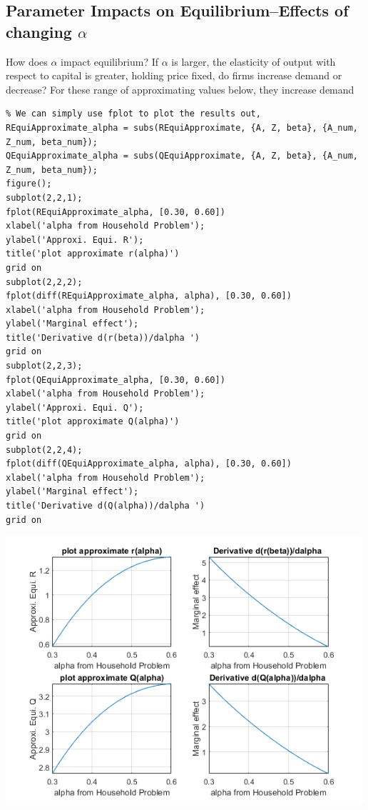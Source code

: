 \documentclass[
]{book}
\begin{document}
\hypertarget{parameter-impacts-on-equilibriumeffects-of-changing-alpha}{%
\subsection{\texorpdfstring{Parameter Impacts on Equilibrium--Effects of changing \(\alpha\)}{Parameter Impacts on Equilibrium--Effects of changing \textbackslash alpha}}\label{parameter-impacts-on-equilibriumeffects-of-changing-alpha}}

How does \(\alpha\) impact equilibrium? If \(\alpha\) is larger, the
elasticity of output with respect to capital is greater, holding price
fixed, do firms increase demand or decrease? For these range of
approximating values below, they increase demand

\begin{verbatim}
% We can simply use fplot to plot the results out, 
REquiApproximate_alpha = subs(REquiApproximate, {A, Z, beta}, {A_num, Z_num, beta_num});
QEquiApproximate_alpha = subs(QEquiApproximate, {A, Z, beta}, {A_num, Z_num, beta_num});
figure();
subplot(2,2,1);
fplot(REquiApproximate_alpha, [0.30, 0.60])
xlabel('alpha from Household Problem');
ylabel('Approxi. Equi. R');
title('plot approximate r(alpha)')
grid on
subplot(2,2,2);
fplot(diff(REquiApproximate_alpha, alpha), [0.30, 0.60])
xlabel('alpha from Household Problem');
ylabel('Marginal effect');
title('Derivative d(r(beta))/dalpha ')
grid on
subplot(2,2,3);
fplot(QEquiApproximate_alpha, [0.30, 0.60])
xlabel('alpha from Household Problem');
ylabel('Approxi. Equi. Q');
title('plot approximate Q(alpha)')
grid on
subplot(2,2,4);
fplot(diff(QEquiApproximate_alpha, alpha), [0.30, 0.60])
xlabel('alpha from Household Problem');
ylabel('Marginal effect');
title('Derivative d(Q(alpha))/dalpha ')
grid on
\end{verbatim}

\includegraphics[width=5.20833in,height=\textheight]{img/demand_supply_taylor_approximate_capital_images/figure_4.png}
\end{document}
